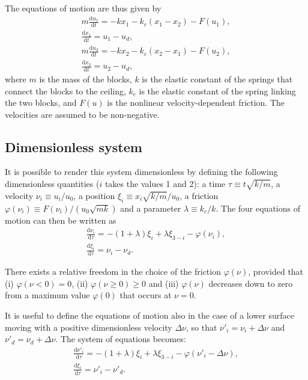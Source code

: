 The equations of motion are thus given by
\begin{equation}
\label{eq: 2 block motion}
    \begin{gathered}
    m\frac{\text{d}u_1}{\text{d}t} = -kx_1 - k_c(x_1-x_2) - F(u_1),\\[10pt]
    \frac{\text{d}x_1}{\text{d}t} = u_1 - u_d,\\[10pt]
    m\frac{\text{d}u_2}{\text{d}t} = -kx_2 - k_c(x_2-x_1) - F(u_2),\\[10pt]
    \frac{\text{d}x_2}{\text{d}t} = u_2 - u_d,
\end{gathered}
\end{equation}
where $m$ is the mass of the blocks, $k$ is the elastic constant of the springs that connect the blocks
to the ceiling, $k_c$ is the elastic constant of the spring linking the two blocks, and $F(u)$ is the nonlinear
velocity-dependent friction. The velocities are assumed to be non-negative.

\subsection{Dimensionless system}
\label{subsec: dimensionless 2 block motion}

It is possible to render this system dimensionless by defining the following dimensionless quantities ($i$ takes the values 1 and 2):
a time $\tau\equiv t\sqrt{k/m}$, a velocity $\nu_i\equiv u_i/u_0$, a position $\xi_i\equiv x_i \sqrt{k/m}/u_0$,
a friction $\varphi(\nu_i)\equiv F(\nu_i)/(u_0\sqrt{mk})$ and a parameter $\lambda\equiv k_c/k$.
The four equations of motion can then be written as
\begin{equation}
\label{eq: 2 block motion dimensionless}
\begin{gathered}
    \frac{\text{d}\nu_i}{\text{d}\tau}=-(1+\lambda)\xi_i+\lambda\xi_{3-i}-\varphi(\nu_i),\\[10pt]
    \frac{\text{d}\xi_i}{\text{d}\tau}=\nu_i-\nu_d.
\end{gathered}
\end{equation}

There exists a relative freedom in the choice of the friction $\varphi(\nu)$, provided that
(i) $\varphi(\nu<0)=0$, (ii) $\varphi(\nu\geq0)\geq0$ and (iii) $\varphi(\nu)$ decreases down to zero from a
maximum value $\varphi(0)$ that occurs at $\nu=0$.

It is useful to define the equations of motion also in the case of a lower surface moving with a positive
dimensionless velocity $\Delta\nu$, so that $\nu'_i=\nu_i+\Delta\nu$ and $\nu'_d=\nu_d+\Delta\nu$.
The system of equations becomes:
\begin{equation}
    \label{eq: 2 block motion dimensionless moving surface}
    \begin{gathered}
        \frac{\text{d}\nu'_i}{\text{d}\tau}=-(1+\lambda)\xi_i+\lambda\xi_{3-i}-\varphi(\nu'_i-\Delta\nu),\\[10pt]
        \frac{\text{d}\xi_i}{\text{d}\tau}=\nu'_i-\nu'_d.
    \end{gathered}
\end{equation}



